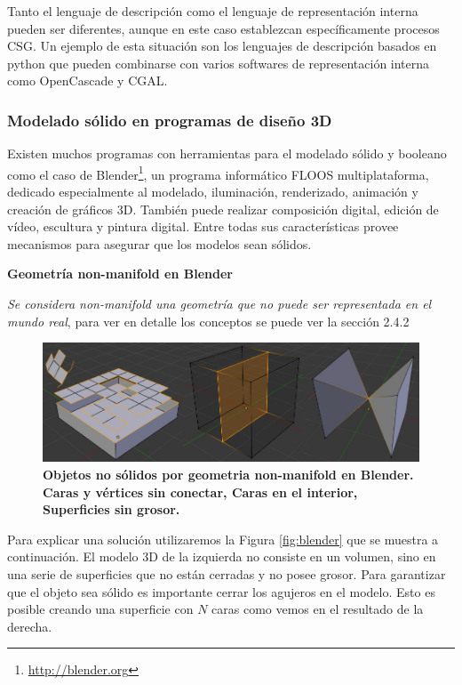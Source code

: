 Tanto el lenguaje de descripción como el lenguaje de representación interna pueden ser diferentes, aunque en este caso establezcan específicamente procesos CSG. Un ejemplo de esta situación son los lenguajes de descripción basados en python que pueden combinarse con varios softwares de representación interna como OpenCascade y CGAL.

\subsubsection{Modelado sólido en programas de diseño 3D}
Existen muchos programas con herramientas para el modelado sólido y booleano como el caso de Blender\footnote{\url{http://blender.org}}, un programa informático FLOOS multiplataforma, dedicado especialmente al modelado, iluminación, renderizado, animación y creación de gráficos 3D. También puede realizar composición digital, edición de vídeo, escultura y pintura digital. Entre todas sus características provee mecanismos para asegurar que los modelos sean sólidos.

\vspace{5mm}
\textbf{Geometría non-manifold en Blender}

\textit{Se considera non-manifold una geometría que no puede ser representada en el mundo real}, para ver en detalle los conceptos se puede ver la sección 2.4.2

\begin{figure}[h]
\includegraphics[width=12cm]{Img/Modelos/modelado20.jpg}
\centering
\caption{\textbf{ \footnotesize{Objetos no sólidos por geometria non-manifold en Blender. Caras y vértices sin conectar, Caras en el interior, Superficies sin grosor.}}}
\end{figure}


Para explicar una solución utilizaremos la Figura \ref{fig:blender} que se muestra a continuación. El modelo 3D de la izquierda no consiste en un volumen, sino en una serie de superficies que no están cerradas y no posee grosor. Para garantizar que el objeto sea sólido es importante cerrar los agujeros en el modelo. Esto es posible creando una superficie con $N$ caras como vemos en el resultado de la derecha.

